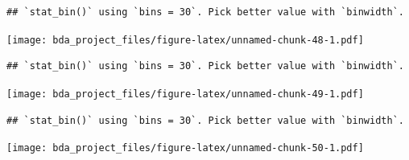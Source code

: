 \documentclass[
]{article}
\newenvironment{Shaded}{\begin{snugshade}}{\end{snugshade}}
\newcommand{\AttributeTok}[1]{\textcolor[rgb]{0.77,0.63,0.00}{#1}}
\newcommand{\DecValTok}[1]{\textcolor[rgb]{0.00,0.00,0.81}{#1}}
\newcommand{\FunctionTok}[1]{\textcolor[rgb]{0.00,0.00,0.00}{#1}}
\newcommand{\NormalTok}[1]{#1}
\newcommand{\SpecialCharTok}[1]{\textcolor[rgb]{0.00,0.00,0.00}{#1}}
\newcommand{\StringTok}[1]{\textcolor[rgb]{0.31,0.60,0.02}{#1}}
\begin{document}
\begin{verbatim}
## `stat_bin()` using `bins = 30`. Pick better value with `binwidth`.
\end{verbatim}

\texttt{[image: bda\_project\_files/figure-latex/unnamed-chunk-48-1.pdf]}

\begin{Shaded}
\end{Shaded}

\begin{verbatim}
## `stat_bin()` using `bins = 30`. Pick better value with `binwidth`.
\end{verbatim}

\texttt{[image: bda\_project\_files/figure-latex/unnamed-chunk-49-1.pdf]}

\begin{Shaded}
\end{Shaded}

\begin{verbatim}
## `stat_bin()` using `bins = 30`. Pick better value with `binwidth`.
\end{verbatim}

\texttt{[image: bda\_project\_files/figure-latex/unnamed-chunk-50-1.pdf]}

\begin{Shaded}
\end{Shaded}
\end{document}
